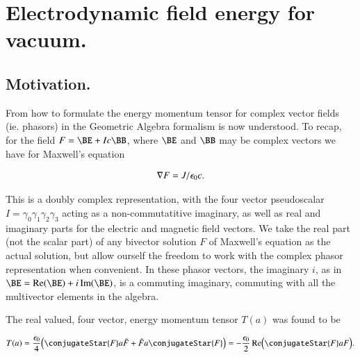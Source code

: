 

\chapter{Electrodynamic field energy for vacuum.}
\label{chap:fourierMaxVac}
{}
\date{Dec 16, 2009}

\beginArtNoToc

\section{Motivation.}

From  how to formulate the energy momentum tensor for complex vector fields (ie. phasors) in the Geometric Algebra formalism is now understood.  To recap, for the field $F = \BE + I c \BB$, where $\BE$ and $\BB$ may be complex vectors we have for Maxwell's equation

\begin{align}\label{eqn:fourierMaxVac:1}
\nabla F = J/\epsilon_0 c.
\end{align}

This is a doubly complex representation, with the four vector pseudoscalar $I = \gamma_0 \gamma_1 \gamma_2 \gamma_3$ acting as a non-commutatitive imaginary, as well as real and imaginary parts for the electric and magnetic field vectors.  We take the real part (not the scalar part) of any bivector solution $F$ of Maxwell's equation as the actual solution, but allow ourself the freedom to work with the complex phasor representation when convenient.  In these phasor vectors, the imaginary $i$, as in $\BE = \Real(\BE) + i \Imag(\BE)$, is a commuting imaginary, commuting with all the multivector elements in the algebra.

The real valued, four vector, energy momentum tensor $T(a)$ was found to be

\begin{align}\label{eqn:fourierMaxVac:2}
T(a) = \frac{\epsilon_0}{4} \Bigl( \conjugateStar{F} a \tilde{F} + \tilde{F} a \conjugateStar{F} \Bigr) = 
-\frac{\epsilon_0}{2} \Real \Bigl( \conjugateStar{F} a F \Bigr).
\end{align}

